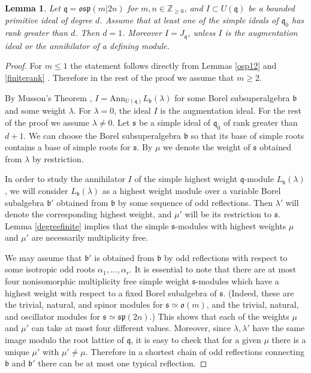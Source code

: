 \documentclass[12pt]{amsart}
\makeatletter
\def\@putname#1#2#3#4{\def\@@ref{#3}\let\old@bf\bf
        \def\bf##1{\old@bf\if?\noexpand##1?{#4}\else##1\fi}%
	#1{#2}%
        \let\bf\old@bf}
\def\@putname#1#2#3#4{\def\@@ref{#3}\let\old@bf\bf	%
	\let\old@reset@font\reset@font			%
        \def\bf##1{\old@bf\if?\noexpand##1?{#4}\else##1\fi}%
	\def\reset@font##1##2{\old@reset@font##1\if?\noexpand##2?{#4}\else##2\fi}#1{#2}%
        \let\bf\old@bf\let\reset@font\old@reset@font}
\let\my@ref=\ref
\def\ref#1{\@putname\my@ref{#1}{#1}{\tiny\rm\@@ref}}
\let\my@cite=\cite
\def\cite#1{\@putname\my@cite{#1}{\@citeb}{\tiny\rm\@@ref}}
\theoremstyle{plain} %
\numberwithin{equation}{section}
\theoremstyle{definition}
\theoremstyle{remark}
\theoremstyle{plain} %
\newtheorem{lemma}[definition]{Lemma}
\renewcommand{\sp}{\mathfrak{sp}}
\newcommand{\so}{\mathfrak{o}}
\newcommand{\osp}{\mathfrak{osp}}
\newcommand{\Ann}{\mathrm{Ann}}
\newcommand{\gs}{\mathfrak{s}}
\def\gb{\mathfrak{b}}
\def\gq{\mathfrak{q}}
\def\gs{\mathfrak{s}}
\makeatother
\begin{document}
  \begin{lemma}\label{boundedideal} Let $\gq=\osp(m|2n)$ for $m, n \in {\mathbb Z}_{\geq 0}$, and $I\subset U(\gq)$ be a bounded primitive ideal of degree $d$. Assume that at least one of the simple ideals of $\gq_{\bar{0}}$ has rank greater than $d$. Then $d=1$. Moreover $I=J_{\mathfrak{q}}$, unless $I$  is the augmentation ideal or  the annihilator of a defining module. 
  \end{lemma}
\begin{proof} For $m \leq 1$ the statement follows directly from Lemmas  \ref{osp12}  and \ref{finiterank}. Therefore in the rest of the proof we assume that $m\geq 2$.

 By Musson's Theorem \cite{Musson}, $I=\Ann_{U(\gq)} L_{\gb}(\lambda)$ for some Borel subsuperalgebra $\gb$ and some weight $\lambda$. For $\lambda=0$, the ideal $I$ is the augmentation ideal. For the rest of the proof we assume $\lambda\neq 0$. Let $\gs$ be a simple ideal of $\gq_{\bar{0}}$ of rank greater than $d+1$. We can choose the Borel subsuperalgebra $\gb$ so that %
	its base of simple roots contains a base of simple roots for
  $\gs$.    By $\mu$ we denote the weight of $\gs$ obtained from $\lambda$ by restriction.
  
 In order to study the annihilator $I$ of the simple highest weight $\gq$-module $L_{\gb}(\lambda)$, we will consider $L_{\gb}(\lambda)$ as a highest weight module over a variable Borel subalgebra $\gb'$ obtained from $\gb$ by some sequence of odd reflections. Then $\lambda'$ will denote the corresponding
  highest weight, and $\mu'$ will be its restriction to $\gs$. Lemma \ref{degreefinite} implies that the simple $\gs$-modules with highest weights $\mu$ and  $\mu'$ are necessarily multiplicity free.
  
  We may assume that $\gb'$ is obtained from $\gb$ by  odd reflections with respect to some isotropic odd  roots $\alpha_1,\dots,\alpha_r$.  It is essential to note that there are at most four nonisomorphic multiplicity free simple  weight $\gs$-modules which have a highest weight with respect to a fixed Borel subalgebra  of $\gs$. (Indeed, these are the trivial, natural, and spinor modules for $\gs \simeq \so (m)$, and the trivial, natural, and oscillator modules for $\gs \simeq \sp (2n)$.)
  This shows that each of the weights $\mu$ and $\mu'$ can take at most four different values. Moreover, since $\lambda,\lambda'$  have the same image modulo the root lattice of $\gq$, it is easy to check that for a given $\mu$ there is a unique $\mu'$ with $\mu'\neq \mu$. Therefore in a shortest chain of odd reflections connecting $\gb$ and $\gb'$ there can be at most one typical reflection. 
 

\end{proof}
\end{document}

